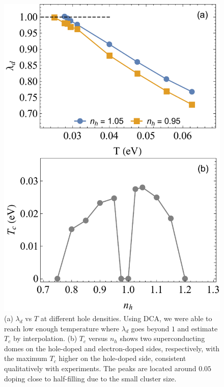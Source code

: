 \documentclass[reprint,nofootinbib,nobibnotes,amsmath,amssymb,aps,prb,floatfix]{revtex4-1}
\begin{document}
\begin{figure}[ht]
\centering
\includegraphics[width=0.83\linewidth]{./Figures/2by2Tc.pdf}
\caption{ (a) $\lambda_d$ vs $T$ at different hole densities. Using DCA, we were able to reach low enough temperature where $\lambda_d$ goes beyond $1$ and estimate $T_c$ by interpolation. (b) $T_c$ versus $n_h$ shows two superconducting domes on the hole-doped and electron-doped sides, respectively, with the maximum $T_c$ higher on the hole-doped side, consistent qualitatively with experiments. The peaks are located around $0.05$ doping close to half-filling due to the small cluster size. 
}
\label{Tcdopedepend}
\end{figure}
\end{document}
